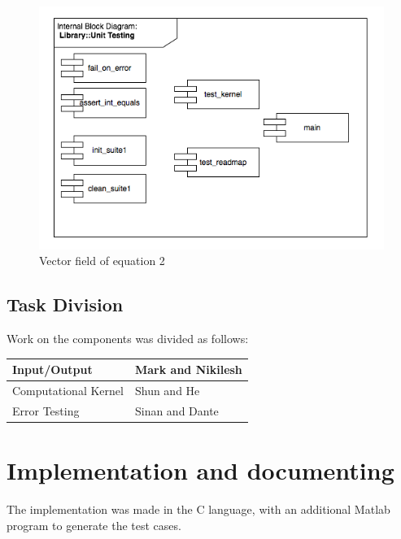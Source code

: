 \documentclass[12pt,a4paper]{article}
\begin{document}
\begin{figure}[hb]
    \centering
    \includegraphics[scale=0.6]{images/bd4.png}
    \caption{Vector field of equation 2}
\end{figure}

\clearpage


\subsection{Task Division}

Work on the components was divided as follows:

\begin{tabular}{ | l || l | }
    \hline
    Input/Output  & Mark and Nikilesh \\
    \hline
    Computational Kernel & Shun and He \\
    \hline
    Error Testing & Sinan and Dante \\
    \hline
\end{tabular}

%
%
%

\section{Implementation and documenting}

The implementation was made in the C language, with an additional Matlab program to generate the test cases. 
\end{document}
